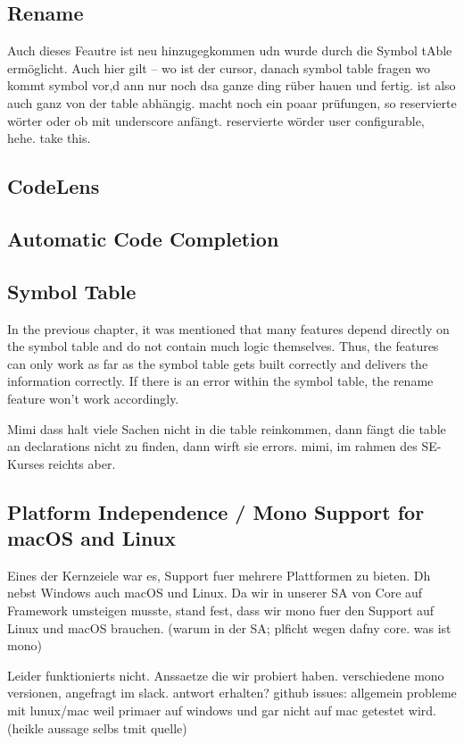 \subsection{Rename}
Auch dieses Feautre ist neu hinzugegkommen udn wurde durch die Symbol tAble ermöglicht.
Auch hier gilt -- wo ist der cursor, danach symbol table fragen wo kommt symbol vor,d ann nur noch dsa ganze ding rüber hauen und fertig.
ist also auch ganz von der table abhängig.
macht noch ein poaar prüfungen, so reservierte wörter oder ob mit underscore anfängt. reservierte wörder user configurable, hehe. take this.

\subsection{CodeLens}

\subsection{Automatic Code Completion}

\subsection{Symbol Table}
In the previous chapter, it was mentioned that many features depend directly on the symbol table and do not contain much logic themselves.
Thus, the features can only work as far as the symbol table gets built correctly and delivers the information correctly.
If there is an error within the symbol table, the rename feature won't work accordingly.

Mimi dass halt viele Sachen nicht in die table reinkommen, dann fängt die table an declarations nicht zu finden, dann wirft sie errors.
mimi, im rahmen des SE-Kurses reichts aber.



\subsection{Platform Independence / Mono Support for macOS and Linux}
Eines der Kernzeiele war es, Support fuer mehrere Plattformen zu bieten. Dh nebst Windows auch macOS und Linux.
Da wir in unserer SA von Core auf Framework umsteigen musste, stand fest, dass wir mono fuer den Support auf Linux und macOS brauchen.
(warum in der SA; plficht wegen dafny core. was ist mono)

Leider funktionierts nicht.
Anssaetze die wir probiert haben. verschiedene mono versionen, angefragt im slack. antwort erhalten?
github issues: allgemein probleme mit lunux/mac weil primaer auf windows und gar nicht auf mac getestet wird. (heikle aussage selbs tmit quelle)

\cite{sa}
\cite{mono-slack}
\cite{mono-git}
